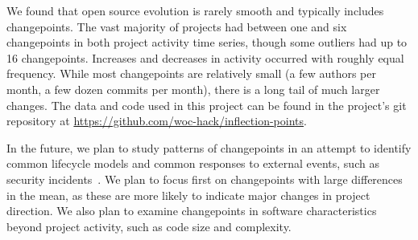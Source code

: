 \documentclass[10pt,conference]{IEEEtran}
\begin{document}
We found that open source evolution is rarely smooth and typically includes changepoints. The vast majority of projects had between one and six changepoints in both project activity time series, though some outliers had up to 16 changepoints. Increases and decreases in activity occurred with roughly equal frequency. While most changepoints are relatively small (a few authors per month, a few dozen commits per month), there is a long tail of much larger changes. The data and code used in this project can be found in the project's git repository at \url{https://github.com/woc-hack/inflection-points}.

In the future, we plan to study patterns of changepoints in an attempt to identify common lifecycle models and common responses to external events, such as security incidents~\cite{openssl2020}. We plan to focus first on changepoints with large differences in the mean, as these are more likely to indicate major changes in project direction. We also plan to examine changepoints in software characteristics beyond project activity, such as code size and complexity. 



\end{document}
